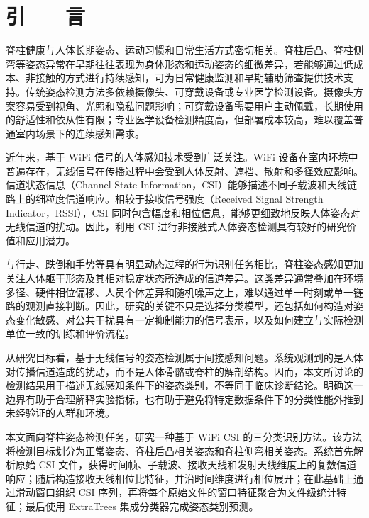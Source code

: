 ﻿%

\chapter*{\hfill 引　　言 \hfill}
{}
\label{chap:intro}

脊柱健康与人体长期姿态、运动习惯和日常生活方式密切相关。脊柱后凸、脊柱侧弯等姿态异常在早期往往表现为身体形态和运动姿态的细微差异，若能够通过低成本、非接触的方式进行持续感知，可为日常健康监测和早期辅助筛查提供技术支持。传统姿态检测方法多依赖摄像头、可穿戴设备或专业医学检测设备。摄像头方案容易受到视角、光照和隐私问题影响；可穿戴设备需要用户主动佩戴，长期使用的舒适性和依从性有限；专业医学设备检测精度高，但部署成本较高，难以覆盖普通室内场景下的连续感知需求。

近年来，基于 WiFi 信号的人体感知技术受到广泛关注。WiFi 设备在室内环境中普遍存在，无线信号在传播过程中会受到人体反射、遮挡、散射和多径效应影响。信道状态信息（Channel State Information，CSI）能够描述不同子载波和天线链路上的细粒度信道响应。相较于接收信号强度（Received Signal Strength Indicator，RSSI），CSI 同时包含幅度和相位信息，能够更细致地反映人体姿态对无线信道的扰动。因此，利用 CSI 进行非接触式人体姿态检测具有较好的研究价值和应用潜力。

与行走、跌倒和手势等具有明显动态过程的行为识别任务相比，脊柱姿态感知更加关注人体躯干形态及其相对稳定状态所造成的信道差异。这类差异通常叠加在环境多径、硬件相位偏移、人员个体差异和随机噪声之上，难以通过单一时刻或单一链路的观测直接判断。因此，研究的关键不只是选择分类模型，还包括如何构造对姿态变化敏感、对公共干扰具有一定抑制能力的信号表示，以及如何建立与实际检测单位一致的训练和评价流程。

从研究目标看，基于无线信号的姿态检测属于间接感知问题。系统观测到的是人体对传播信道造成的扰动，而不是人体骨骼或脊柱的解剖结构。因而，本文所讨论的检测结果用于描述无线感知条件下的姿态类别，不等同于临床诊断结论。明确这一边界有助于合理解释实验指标，也有助于避免将特定数据条件下的分类性能外推到未经验证的人群和环境。

本文面向脊柱姿态检测任务，研究一种基于 WiFi CSI 的三分类识别方法。该方法将检测目标划分为正常姿态、脊柱后凸相关姿态和脊柱侧弯相关姿态。系统首先解析原始 CSI 文件，获得时间帧、子载波、接收天线和发射天线维度上的复数信道响应；随后构造接收天线相位比特征，并沿时间维度进行相位展开；在此基础上通过滑动窗口组织 CSI 序列，再将每个原始文件的窗口特征聚合为文件级统计特征；最后使用 ExtraTrees 集成分类器完成姿态类别预测。

